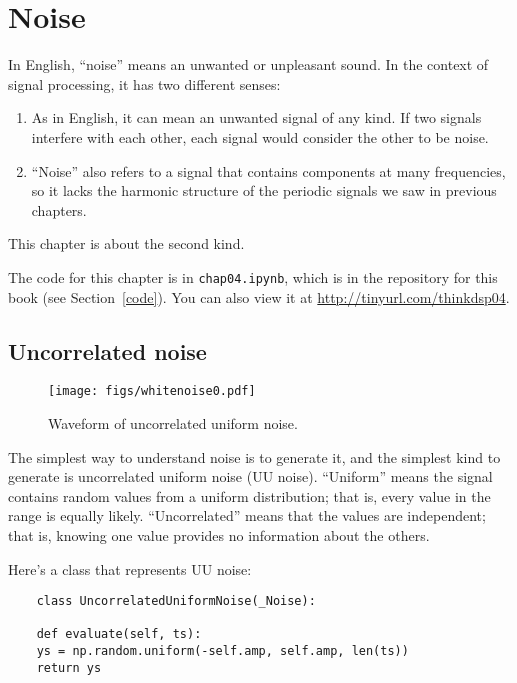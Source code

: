 \chapter{Noise}

In English, ``noise'' means an unwanted or unpleasant sound.  In the
context of signal processing, it has two different senses:

\begin{enumerate}
	
	\item As in English, it can mean an unwanted signal of any kind.  If
	two signals interfere with each other, each signal would consider
	the other to be noise.
	
	\item ``Noise'' also refers to a signal that contains components at
	many frequencies, so it lacks the harmonic structure of the periodic
	signals we saw in previous chapters.
	
\end{enumerate}

This chapter is about the second kind.

The code for this chapter is in {\tt chap04.ipynb}, which is in the
repository for this book (see Section~\ref{code}).
You can also view it at \url{http://tinyurl.com/thinkdsp04}.


\section{Uncorrelated noise}

\begin{figure}
	\centerline{\texttt{[image: figs/whitenoise0.pdf]}}
	\caption{Waveform of uncorrelated uniform noise.}
	\label{fig.whitenoise0}
\end{figure}

The simplest way to understand noise is to generate it, and the
simplest kind to generate is uncorrelated uniform noise (UU noise).
``Uniform'' means the signal contains random values from a uniform
distribution; that is, every value in the range is equally likely.
``Uncorrelated'' means that the values are independent; that is,
knowing one value provides no information about the others.

Here's a class that represents UU noise:

\begin{verbatim}
	class UncorrelatedUniformNoise(_Noise):
	
	def evaluate(self, ts):
	ys = np.random.uniform(-self.amp, self.amp, len(ts))
	return ys
\end{verbatim}

